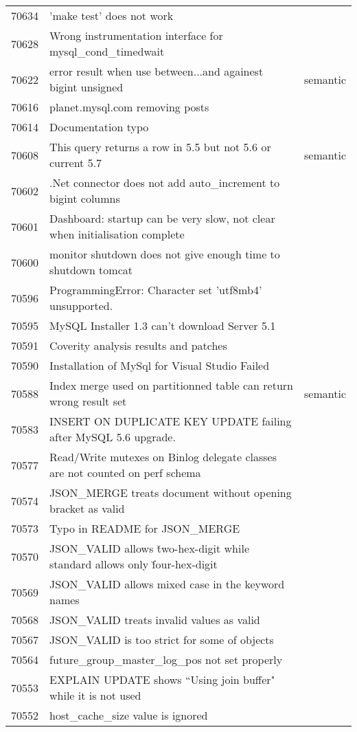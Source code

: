 \begin{longtable}[c]{p{1cm}p{10cm}p{1cm}}
70634 & 'make test' does not work &  \\
70628 & Wrong instrumentation interface for mysql\_cond\_timedwait &  \\
70622 & error result when use between...and againest bigint unsigned & semantic \\
70616 & planet.mysql.com removing posts &  \\
70614 & Documentation typo &  \\
70608 & This query returns a row in 5.5 but not 5.6 or current 5.7 & semantic \\
70602 & .Net connector does not add auto\_increment to bigint columns &  \\
70601 & Dashboard: startup can be very slow, not clear when initialisation complete &  \\
70600 & monitor shutdown does not give enough time to shutdown tomcat &  \\
70596 & ProgrammingError: Character set 'utf8mb4' unsupported. &  \\
70595 & MySQL Installer 1.3 can't download Server 5.1 &  \\
70591 & Coverity analysis results and patches &  \\
70590 & Installation of MySql for Visual Studio Failed &  \\
70588 & Index merge used on partitionned table can return wrong result set & semantic \\
70583 & INSERT ON DUPLICATE KEY UPDATE failing after MySQL 5.6 upgrade. &  \\
70577 & Read/Write mutexes on Binlog delegate classes are not counted on perf schema &  \\
70574 & JSON\_MERGE treats document without opening bracket as valid &  \\
70573 & Typo in README for JSON\_MERGE &  \\
70570 & JSON\_VALID allows \u two-hex-digit while standard allows only \u four-hex-digit &  \\
70569 & JSON\_VALID allows mixed case in the keyword names &  \\
70568 & JSON\_VALID treats invalid values as valid &  \\
70567 & JSON\_VALID is too strict for some of objects &  \\
70564 & future\_group\_master\_log\_pos not set properly &  \\
70553 & EXPLAIN UPDATE shows ``Using join buffer" while it is not used &  \\
70552 & host\_cache\_size value is ignored &  \\

\end{longtable}
